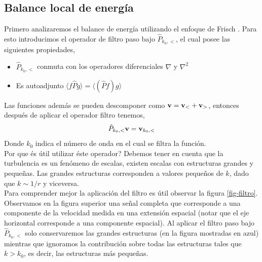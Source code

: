 \documentclass[executivepaper,12pt]{article}
\numberwithin{equation}{section}
\begin{document}
\subsection{Balance local de energía}

Primero analizaremos el balance de energía utilizando el enfoque de Frisch \parencite{frisch1995}. Para esto introducimos el operador de filtro paso bajo $\hat{P}_{k_0,<}$, el cual posee las siguientes propiedades,
\begin{itemize}
	\item $\hat{P}_{k_0,<}$ conmuta con los operadores diferenciales $\nabla$ y $\nabla^2$
	\item Es autoadjunto $\langle f \hat{P}g \rangle=\langle (\hat{P}f) g \rangle$
\end{itemize}
 Las funciones además se pueden descomponer como $\vb{v}=\vb{v}_{<}+\vb{v}_{>}$, entonces después de aplicar el operador filtro tenemos,
 \begin{equation*}
 	\hat{P}_{k_0,<}\vb{v}=\vb{v}_{k_0,<}
 \end{equation*}
 Donde $k_0$ indica el número de onda en el cual se filtra la función. \\
 Por que és útil utilizar éste operador? Debemos tener en cuenta que la turbulencia es un fenómeno de escalas, existen escalas con estructuras grandes y pequeñas. Las grandes estructuras corresponden a valores pequeños de $k$, dado que $k\sim 1/r$ y viceversa.\\
  Para comprender mejor la aplicación del filtro es útil observar la figura \ref{fig-filtro}. Observamos en la figura superior una señal completa que corresponde a una componente de la velocidad medida en una extensión espacial (notar que el eje horizontal corresponde a una componente espacial). Al aplicar el filtro paso bajo $\hat{P}_{k_0,<}$ solo conservaremos las grandes estructuras (en la figura mostradas en azul) mientras que ignoramos la contribución sobre todas las estructuras tales que $k>k_0$, es decir, las estructuras más pequeñas. 
 
\end{document}
